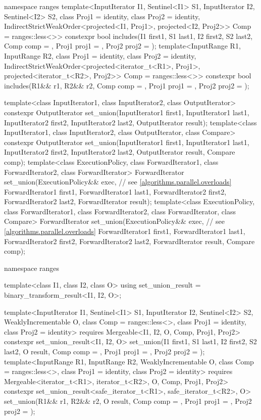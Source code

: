 \begin{codeblock}
{  namespace ranges {
    template<InputIterator I1, Sentinel<I1> S1, InputIterator I2, Sentinel<I2> S2,
        class Proj1 = identity, class Proj2 = identity,
        IndirectStrictWeakOrder<projected<I1, Proj1>, projected<I2, Proj2>> Comp = ranges::less<>>
      constexpr bool includes(I1 first1, S1 last1, I2 first2, S2 last2, Comp comp = {},
                              Proj1 proj1 = {}, Proj2 proj2 = {});
    template<InputRange R1, InputRange R2, class Proj1 = identity,
        class Proj2 = identity,
        IndirectStrictWeakOrder<projected<iterator_t<R1>, Proj1>,
          projected<iterator_t<R2>, Proj2>> Comp = ranges::less<>>
      constexpr bool includes(R1&& r1, R2&& r2, Comp comp = {},
                              Proj1 proj1 = {}, Proj2 proj2 = {});
  }

  template<class InputIterator1, class InputIterator2, class OutputIterator>
    constexpr OutputIterator
      set_union(InputIterator1 first1, InputIterator1 last1,
                InputIterator2 first2, InputIterator2 last2,
                OutputIterator result);
  template<class InputIterator1, class InputIterator2, class OutputIterator, class Compare>
    constexpr OutputIterator
                set_union(InputIterator1 first1, InputIterator1 last1,
                InputIterator2 first2, InputIterator2 last2,
                OutputIterator result, Compare comp);
  template<class ExecutionPolicy, class ForwardIterator1, class ForwardIterator2,
           class ForwardIterator>
    ForwardIterator
      set_union(ExecutionPolicy&& exec, // see \ref{algorithms.parallel.overloads}
                ForwardIterator1 first1, ForwardIterator1 last1,
                ForwardIterator2 first2, ForwardIterator2 last2,
                ForwardIterator result);
  template<class ExecutionPolicy, class ForwardIterator1, class ForwardIterator2,
           class ForwardIterator, class Compare>
    ForwardIterator
      set_union(ExecutionPolicy&& exec, // see \ref{algorithms.parallel.overloads}
                ForwardIterator1 first1, ForwardIterator1 last1,
                ForwardIterator2 first2, ForwardIterator2 last2,
                ForwardIterator result, Compare comp);

  namespace ranges {
    template<class I1, class I2, class O>
    using set_union_result = binary_transform_result<I1, I2, O>;

    template<InputIterator I1, Sentinel<I1> S1, InputIterator I2, Sentinel<I2> S2,
        WeaklyIncrementable O, class Comp = ranges::less<>, class Proj1 = identity, class Proj2 = identity>
      requires Mergeable<I1, I2, O, Comp, Proj1, Proj2>
      constexpr set_union_result<I1, I2, O>
        set_union(I1 first1, S1 last1, I2 first2, S2 last2, O result, Comp comp = {},
                  Proj1 proj1 = {}, Proj2 proj2 = {});
    template<InputRange R1, InputRange R2, WeaklyIncrementable O,
        class Comp = ranges::less<>, class Proj1 = identity, class Proj2 = identity>
      requires Mergeable<iterator_t<R1>, iterator_t<R2>, O, Comp, Proj1, Proj2>
      constexpr set_union_result<safe_iterator_t<R1>, safe_iterator_t<R2>, O>
        set_union(R1&& r1, R2&& r2, O result, Comp comp = {},
                  Proj1 proj1 = {}, Proj2 proj2 = {});
  }

}
\end{codeblock}

